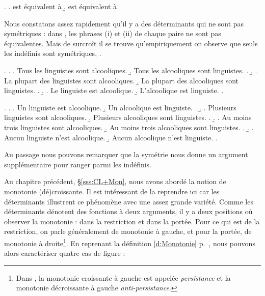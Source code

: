 \ex.
\a.
 est équivalent à 
\b.
 est équivalent à 

Nous constatons assez rapidement qu'il y a des déterminants qui ne sont pas symétriques : dans \Next, les phrases (i) et (ii) de chaque paire ne sont pas équivalentes.  Mais de surcroît il se trouve qu'empiriquement on observe que seuls les indéfinis sont symétriques, \NNext. 

\ex.
\a.
\a. Tous les linguistes sont alcooliques.
\b. Tous les alcooliques sont linguistes.
\z.
\b.
\a. La plupart des linguistes sont alcooliques.
\b. La plupart des alcooliques sont linguistes.
\z.
\b.
\a. Le linguiste est alcoolique.
\b. L'alcoolique est linguiste.
\z.


\ex.
\a.
\a. Un linguiste est alcoolique.
\b. Un alcoolique est linguiste.
\z.
\b.
\a. Plusieurs linguistes sont alcooliques.
\b. Plusieurs alcooliques sont linguistes.
\z.
\b.
\a. Au moins trois linguistes sont alcooliques.
\b. Au moins trois alcooliques sont linguistes.
\z.
\b.
\a. Aucun linguiste n'est alcoolique.
\b. Aucun alcoolique n'est linguiste.
\z.


Au passage nous pouvons remarquer que la symétrie nous donne un argument supplémentaire pour ranger  parmi les indéfinis. 


Au chapitre précédent, \S\ref{sss:CL+Mon}, nous avons abordé la notion de monotonie  (dé)crois\-sante.
Il est intéressant de la reprendre ici car les déterminants illustrent ce phénomène avec une assez grande variété.
Comme les déterminants dénotent des fonctions à deux arguments, il y a deux positions où observer la monotonie : dans la restriction et dans la portée.
Pour ce qui est de la restriction, on parle généralement de monotonie à gauche, et pour la portée, de monotonie à droite\footnote{Dans \citet{BarwiseCooper:81}, la monotonie croissante à gauche est appelée \emph{persistance} et la monotonie décroissante à gauche \emph{anti-persistance}.}.
En reprenant la définition \ref{d:Monotonie} p.~\pageref{d:Monotonie}, nous pouvons alors caractériser quatre cas de figure :



